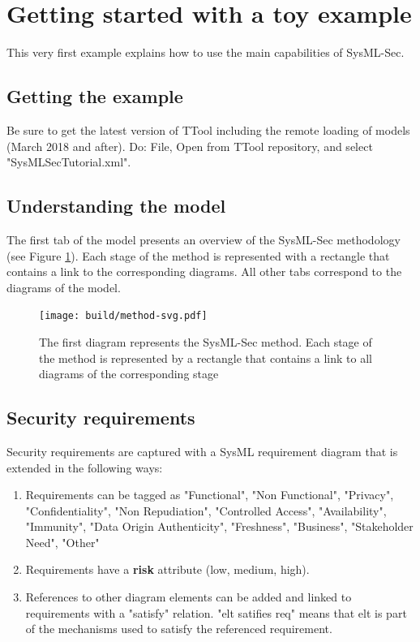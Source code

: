 \documentclass[12pt]{article}
\begin{document}
\newpage
\section{Getting started with a toy example}\label{sec:example}
This very first example explains how to use the main capabilities of SysML-Sec.

\subsection{Getting the example}
Be sure to get the latest version of TTool including the remote loading of models (March 2018 and after). Do: File, Open from TTool repository, and select "SysMLSecTutorial.xml".

\subsection{Understanding the model}
The first tab of the model presents an overview of the SysML-Sec methodology (see Figure \ref{fig:method}). Each stage of the method is represented with a rectangle that contains a link to the corresponding diagrams.  All other tabs correspond to the diagrams of the model.


\begin{figure}[htbp]
\centering
\texttt{[image: build/method-svg.pdf]}

\caption{The first diagram represents the SysML-Sec method. Each stage of the method is represented by a rectangle that contains a link to all diagrams of the corresponding stage} \label{fig:method}
\end{figure}

\subsection{Security requirements}
Security requirements are captured with a SysML requirement diagram that is extended in the following ways:
\begin{enumerate}
\item Requirements can be tagged as "Functional", "Non Functional", "Privacy", "Confidentiality", "Non Repudiation", "Controlled Access", "Availability", "Immunity", "Data Origin Authenticity", "Freshness", "Business", "Stakeholder Need", "Other"
\item Requirements have a \textbf{risk} attribute (low, medium, high).
\item References to other diagram elements can be added and linked to requirements with a "satisfy" relation. "elt satifies req" means that elt is part of the mechanisms used to satisfy the referenced requirement.
\end{enumerate}
\end{document}
